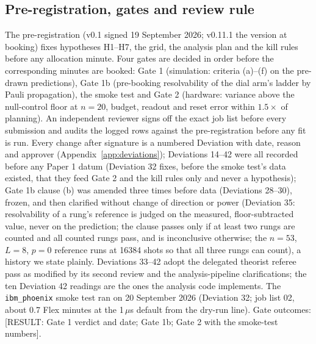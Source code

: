 \documentclass[aps,prxquantum,reprint,superscriptaddress,nofootinbib,longbibliography,amsmath,amssymb]{revtex4-2}
\newcommand{\placeholder}[1]{\textcolor{red!70!black}{[RESULT: #1]}}
\begin{document}
\subsection{Pre-registration, gates and review rule}\label{sec:gates}
The pre-registration (v0.1 signed 19 September 2026; v0.11.1 the version at booking) fixes hypotheses H1--H7, the grid, the analysis plan and the kill rules before any allocation minute. Four gates are decided in order before the corresponding minutes are booked: Gate 1 (simulation: criteria (a)--(f) on the pre-drawn predictions), Gate 1b (pre-booking resolvability of the dial arm's ladder by Pauli propagation), the smoke test and Gate 2 (hardware: variance above the null-control floor at $n = 20$, budget, readout and reset error within $1.5\times$ of planning). An independent reviewer signs off the exact job list before every submission and audits the logged rows against the pre-registration before any fit is run. Every change after signature is a numbered Deviation with date, reason and approver (Appendix~\ref{app:deviations}); Deviations 14--42 were all recorded before any Paper 1 datum (Deviation 32 fixes, before the smoke test's data existed, that they feed Gate 2 and the kill rules only and never a hypothesis); Gate 1b clause (b) was amended three times before data (Deviations 28--30), frozen, and then clarified without change of direction or power (Deviation 35: resolvability of a rung's reference is judged on the measured, floor-subtracted value, never on the prediction; the clause passes only if at least two rungs are counted and all counted rungs pass, and is inconclusive otherwise; the $n = 53$, $L = 8$, $p = 0$ reference runs at 16384 shots so that all three rungs can count), a history we state plainly. Deviations 33--42 adopt the delegated theorist referee pass as modified by its second review and the analysis-pipeline clarifications; the ten Deviation 42 readings are the ones the analysis code implements. The \texttt{ibm\_phoenix} smoke test ran on 20 September 2026 (Deviation 32; job list 02, about 0.7 Flex minutes at the 1\,$\mu$s default from the dry-run line). Gate outcomes: \placeholder{Gate 1 verdict and date; Gate 1b; Gate 2 with the smoke-test numbers}.
\end{document}
